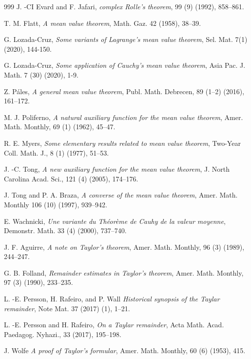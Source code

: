 \documentclass[leqno, a4paper, 12pt]{jsarticle}
\begin{document}
\begin{thebibliography}{999}
J. -CI Evard and 
F. Jafari, 
\textit{
complex Rolle's theorem}, 
99 (9) (1992), 858--861. 


T. M. Flatt, 
\textit{
A mean value theorem}, 
Math. Gaz. 42 (1958), 
38--39. 





G. Lozada-Cruz, 
\textit{Some variants of Lagrange's mean value theorem}, 
Sel. Mat. 7(1) (2020), 
144-150. 


G. Lozada-Cruz, 
\textit{Some application 
 of Cauchy's mean value theorem}, 
Asia Pac. J. Math.  7 (30) (2020), 
1-9.  




Z. P\'{a}les, 
\textit{
A general mean value theorem}, 
Publ. Math. Debrecen, 
89 (1--2) (2016), 
161--172. 


M. J. Poliferno, 
\textit{
A natural auxiliary function for the mean value theorem}, 
Amer. Math. Monthly, 
69 (1) (1962), 45--47. 

R. E. Myers, 
\textit{
Some elementary results related to mean value theorem}, 
Two-Year Coll. Math. J., 
8 (1) (1977), 
51--53. 

J. -C. Tong, 
\textit{
A new auxiliary function 
for the mean value theorem}, 
J. North Carolina Acad. Sci., 
121 (4) (2005), 174--176. 


J. Tong and P. A. Braza, 
\textit{A converse of the mean value theorem}, Amer. Math. Monthly 106 (10) (1997), 939--942.

E. Wachnicki, 
\textit{
Une variante
du 
Th\'{e}or\`{e}me 
de Cauhy
de la 
valeur
moyenne}, 
Demonstr. Math. 
33 (4) (2000), 737--740. 




J. F. Aguirre, 
\textit{A note on Taylor's theorem}, 
Amer. Math. Monthly, 
96 (3) (1989), 
244--247. 



G. B. Folland, 
\textit{Remainder 
estimates in Taylor's theorem}, 
Amer. Math. Monthly, 
97 (3) (1990), 233--235. 




L. -E. Persson, 
H. Rafeiro, 
and 
P. Wall
\textit{
Historical synopsis of the 
Taylar remainder}, 
Note Mat. 
37 (2017) (1), 
1--21. 


L. -E. Persson and 
H. Rafeiro, 
\textit{
On a Taylar remainder}, 
Acta Math. Acad. Paedagog. Nyhazi., 
33 (2017), 195--198. 




J. Wolfe 
\textit{A proof of Taylor's formular}, 
Amer. Math. Monthly, 
60 (6) (1953), 415.

\end{thebibliography}






			
\end{document}
